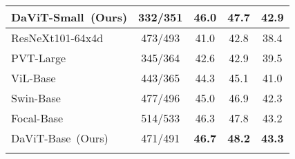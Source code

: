 \documentclass[runningheads]{llncs}
\newcommand{\modelInTable}{DaViT\xspace}
\newlength\savewidth
\newcommand\shline{\noalign{\global\savewidth\arrayrulewidth
  \global\arrayrulewidth 1pt}\hline\noalign{\global\arrayrulewidth\savewidth}}
\begin{document}
\begin{table}[t!]
{\begin{tabular}{l|c|c|cc}
    \rowcolor{Gray}
    \modelInTable-Small~(Ours) &332/351& \textbf{46.0} & \textbf{47.7} & \textbf{42.9} \\
    \hline
    ResNeXt101-64x4d~\cite{xie2017aggregated} &473/493& 41.0 & 42.8 & 38.4 \\    
    PVT-Large~\cite{wang2021pyramid}  &345/364& 42.6 & 42.9 & 39.5 \\
    ViL-Base~\cite{zhang2021multi} &443/365& 44.3 & 45.1 & 41.0 \\
    Swin-Base~\cite{liu2021swin} &477/496& 45.0 & 46.9 & 42.3 \\  
    Focal-Base~\cite{yang2021focal} &514/533& 46.3 & 47.8 & 43.2 \\
    \rowcolor{Gray}
    \modelInTable-Base~(Ours) &471/491& \textbf{46.7} & \textbf{48.2} & \textbf{43.3} \\
    \shline
    \end{tabular}}
    \label{tab:object_detection}
    \vspace{-8pt}
\end{table} 
\end{document}
